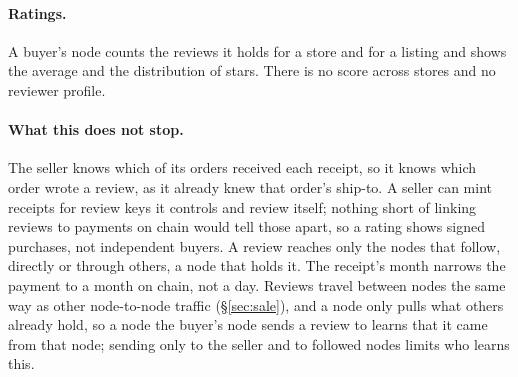 \paragraph{Ratings.} A buyer's node counts the reviews it holds for a store and for a listing and shows the average and the distribution of stars. There is no score across stores and no reviewer profile.

\paragraph{What this does not stop.} The seller knows which of its orders received each receipt, so it knows which order wrote a review, as it already knew that order's ship-to. A seller can mint receipts for review keys it controls and review itself; nothing short of linking reviews to payments on chain would tell those apart, so a rating shows signed purchases, not independent buyers. A review reaches only the nodes that follow, directly or through others, a node that holds it. The receipt's month narrows the payment to a month on chain, not a day. Reviews travel between nodes the same way as other node-to-node traffic (\S\ref{sec:sale}), and a node only pulls what others already hold, so a node the buyer's node sends a review to learns that it came from that node; sending only to the seller and to followed nodes limits who learns this.
